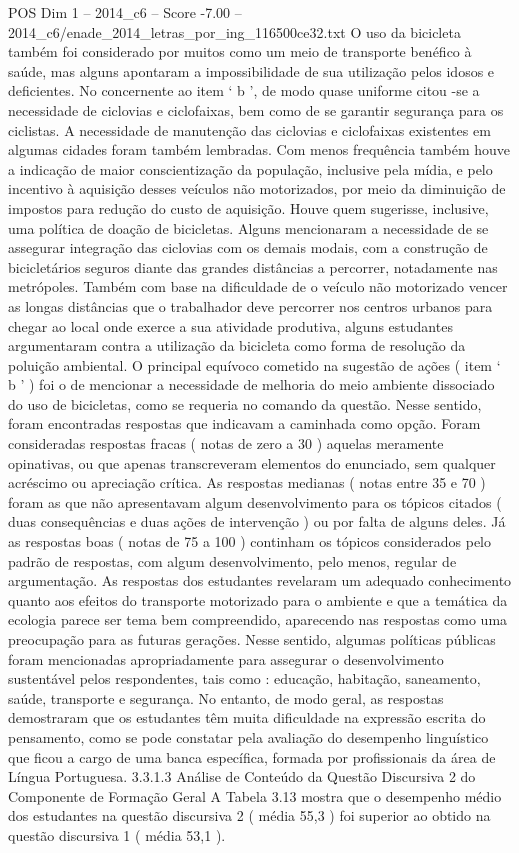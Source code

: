 \begin{textsample}{POS Dim 1 – 2014\_c6 – Score -7.00 – 2014\_c6/enade\_2014\_letras\_por\_ing\_116500ce32.txt}
O uso da bicicleta também foi considerado por muitos como um meio de transporte benéfico à saúde, mas alguns apontaram a impossibilidade de sua utilização pelos idosos e deficientes.
No concernente ao item ‘ b ’, de modo quase uniforme citou -se a necessidade de ciclovias e ciclofaixas, bem como de se garantir segurança para os ciclistas.
A necessidade de manutenção das ciclovias e ciclofaixas existentes em algumas cidades foram também lembradas.
Com menos frequência também houve a indicação de maior conscientização da população, inclusive pela mídia, e pelo incentivo à aquisição desses veículos não motorizados, por meio da diminuição de impostos para redução do custo de aquisição.
Houve quem sugerisse, inclusive, uma política de doação de bicicletas.
Alguns mencionaram a necessidade de se assegurar integração das ciclovias com os demais modais, com a construção de bicicletários seguros diante das grandes distâncias a percorrer, notadamente nas metrópoles.
Também com base na dificuldade de o veículo não motorizado vencer as longas distâncias que o trabalhador deve percorrer nos centros urbanos para chegar ao local onde exerce a sua atividade produtiva, alguns estudantes argumentaram contra a utilização da bicicleta como forma de resolução da poluição ambiental.
O principal equívoco cometido na sugestão de ações ( item ‘ b ’ ) foi o de mencionar a necessidade de melhoria do meio ambiente dissociado do uso de bicicletas, como se requeria no comando da questão.
Nesse sentido, foram encontradas respostas que indicavam a caminhada como opção.
Foram consideradas respostas fracas ( notas de zero a 30 ) aquelas meramente opinativas, ou que apenas transcreveram elementos do enunciado, sem qualquer acréscimo ou apreciação crítica.
As respostas medianas ( notas entre 35 e 70 ) foram as que não apresentavam algum desenvolvimento para os tópicos citados ( duas consequências e duas ações de intervenção ) ou por falta de alguns deles.
Já as respostas boas ( notas de 75 a 100 ) continham os tópicos considerados pelo padrão de respostas, com algum desenvolvimento, pelo menos, regular de argumentação.
As respostas dos estudantes revelaram um adequado conhecimento quanto aos efeitos do transporte motorizado para o ambiente e que a temática da ecologia parece ser tema bem compreendido, aparecendo nas respostas como uma preocupação para as futuras gerações.
Nesse sentido, algumas políticas públicas foram mencionadas apropriadamente para assegurar o desenvolvimento sustentável pelos respondentes, tais como : educação, habitação, saneamento, saúde, transporte e segurança.
No entanto, de modo geral, as respostas demostraram que os estudantes têm muita dificuldade na expressão escrita do pensamento, como se pode constatar pela avaliação do desempenho linguístico que ficou a cargo de uma banca específica, formada por profissionais da área de Língua Portuguesa. 3.3.1.3 Análise de Conteúdo da Questão Discursiva 2 do Componente de Formação Geral A Tabela 3.13 mostra que o desempenho médio dos estudantes na questão discursiva 2 ( média 55,3 ) foi superior ao obtido na questão discursiva 1 ( média 53,1 ).

\end{textsample}
